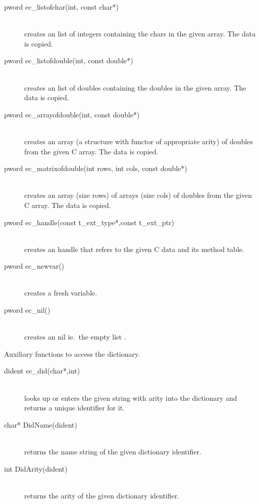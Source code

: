\begin{description}
\item[pword		ec_listofchar(int, const char*)]\ \\
	creates an {\eclipse} list of integers containing the chars in the given array.
	The data is copied.

\item[pword		ec_listofdouble(int, const double*)]\ \\
	creates an {\eclipse} list of doubles containing the doubles in the given array.
	The data is copied.

\item[pword		ec_arrayofdouble(int, const double*)]\ \\
	creates an {\eclipse} array (a structure with functor \nil of
	appropriate arity) of doubles from the given C array.
	The data is copied.

\item[pword		ec_matrixofdouble(int rows, int cols, const double*)]\ \\
	creates an {\eclipse} array (size rows) of arrays (size cols) of doubles
	from the given C array.  The data is copied.

\item[pword		ec_handle(const t_ext_type*,const t_ext_ptr)]\ \\
	creates an {\eclipse} handle that refers to the given C data and its
	method table.

\item[pword		ec_newvar()]\ \\
	creates a fresh {\eclipse} variable.

\item[pword		ec_nil()]\ \\
	creates an {\eclipse} nil ie.\ the empty list \nil.
\end{description}

Auxiliary functions to access the {\eclipse} dictionary.
\begin{description}
\item[dident		ec_did(char*,int)]\ \\
	looks up or enters the given string with arity into the {\eclipse}
	dictionary and returns a unique identifier for it.
\item[char*		DidName(dident)]\ \\
	returns the name string of the given dictionary identifier.
\item[int		DidArity(dident)]\ \\
	returns the arity of the given dictionary identifier.
\end{description}



